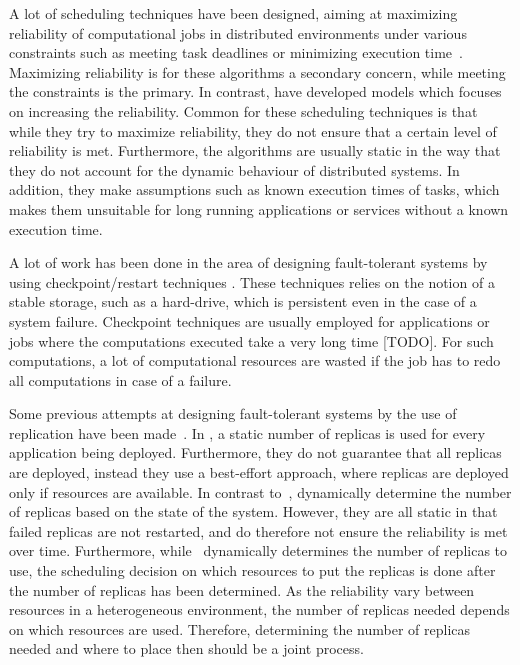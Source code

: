\documentclass{cslthse-msc}
\begin{document}
A lot of scheduling techniques have been designed, aiming at maximizing reliability of computational jobs in distributed environments under various constraints such as meeting task deadlines or minimizing execution time~\cite{algoOptTimeMaxRel, optTaskAllocationForMaxRel, taskAllocation, taskAllocationSwarm, algoMaxRelEndToEndConstraint, algoMinExTime, schedReplicas}. Maximizing reliability is for these algorithms a secondary concern, while meeting the constraints is the primary. In contrast, \cite{optResourceAllMaxPerformance, matchSchedAlgoMinFailure, safetyRelTaskAllocation, improvedTaskAllMaxRel} have developed models which focuses on increasing the reliability. Common for these scheduling techniques is that while they try to maximize reliability, they do not ensure that a certain level of reliability is met. Furthermore, the algorithms are usually static in the way that they do not account for the dynamic behaviour of distributed systems. In addition, they make assumptions such as known execution times of tasks, which makes them unsuitable for long running applications or services without a known execution time.

A lot of work has been done in the area of designing fault-tolerant systems by using checkpoint/restart techniques \cite{adaptiveCheckPointAndRep, IEEEfaultTolerantSys, faultTolerantDeadlock}. These techniques relies on the notion of a stable storage, such as a hard-drive, which is persistent even in the case of a system failure. Checkpoint techniques are usually employed for applications or jobs where the computations executed take a very long time [TODO]. For such computations, a lot of computational resources are wasted if the job has to redo all computations in case of a failure. %

Some previous attempts at designing fault-tolerant systems by the use of replication have been made~\cite{designFaultTolerantSched, evalReplicationSched, taskSchedulingReplication, effTaskReplMobGrid, relGridServicePredConstraint}. In \cite{evalReplicationSched}, a static number of replicas is used for every application being deployed. Furthermore, they do not guarantee that all replicas are deployed, instead they use a best-effort approach, where replicas are deployed only if resources are available. In contrast to~\cite{evalReplicationSched}, \cite{ effTaskReplMobGrid, taskSchedulingReplication, designFaultTolerantSched} dynamically determine the number of replicas based on the state of the system. However, they are all static in that failed replicas are not restarted, and do therefore not ensure the reliability is met over time. Furthermore, while~\cite{designFaultTolerantSched} dynamically determines the number of replicas to use, the scheduling decision on which resources to put the replicas is done after the number of replicas has been determined. As the reliability vary between resources in a heterogeneous environment, the number of replicas needed depends on which resources are used. Therefore, determining the number of replicas needed and where to place then should be a joint process.
\end{document}
